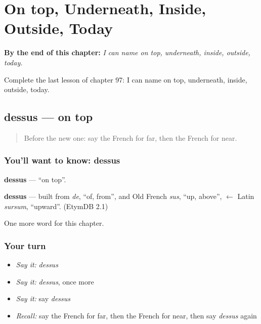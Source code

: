 
\chapter{On top, Underneath, Inside, Outside, Today}
\label{ch:fr-on-top-underneath-inside-outside-today}

\begin{chapteropening}
\textbf{By the end of this chapter:} \emph{I can name on top, underneath, inside, outside, today.}

Complete the last lesson of chapter 97: I can name on top, underneath, inside, outside, today.
\end{chapteropening}

\section[dessus]{dessus — on top}

\label{lesson:FR-C97-dessus}



\begin{quote}
Before the new one: say the French for far, then the French for near.
\end{quote}

\subsection*{You'll want to know: dessus}
\textbf{dessus} — \textquotedblleft{}on top\textquotedblright{}.

\begin{cousinweb}
\textbf{dessus} — built from \emph{de}, \textquotedblleft{}of, from\textquotedblright{}, and Old French \emph{sus}, \textquotedblleft{}up, above\textquotedblright{}, $\leftarrow$ Latin \emph{sursum}, \textquotedblleft{}upward\textquotedblright{}. (EtymDB 2.1)
\end{cousinweb}

\begin{grammarlens}[title={What you've built}]
One more word for this chapter.
\end{grammarlens}

\subsection*{Your turn}
\begin{itemize}
\raggedright
  \item \emph{Say it:} \emph{dessus}
  \item \emph{Say it:} \emph{dessus}, once more
  \item \emph{Say it:} say \emph{dessus}
  \item \emph{Recall:} say the French for far, then the French for near, then say \emph{dessus} again
\end{itemize}

